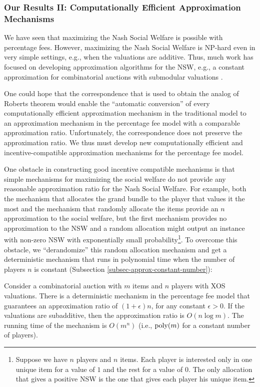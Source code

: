 \documentclass{theoretics}
\newcommand{\poly}{\hbox{poly}}
\begin{document}
\subsubsection*{Our Results II: Computationally Efficient Approximation Mechanisms}

We have seen that maximizing the Nash Social Welfare is possible with percentage fees. However, maximizing the Nash Social Welfare is NP-hard even in very simple settings, e.g., when the valuations are additive. Thus, much work has focused on developing approximation algorithms for the NSW, e.g., a constant approximation for combinatorial auctions with submodular valuations \cite{LV22,GHLVV22}. 



One could hope that the correspondence that is used to obtain the analog of Roberts theorem would enable the ``automatic conversion'' of every computationally efficient approximation mechanism in the traditional model to an approximation mechanism in the percentage fee model with a comparable approximation ratio. Unfortunately, the correspondence does not preserve the approximation ratio. We thus must develop new computationally efficient and incentive-compatible approximation mechanisms for the percentage fee model.





One obstacle in constructing good incentive compatible mechanisms is that simple mechanisms for maximizing the social welfare do not provide any reasonable approximation ratio for the Nash Social Welfare. For example, both the mechanism that allocates the grand bundle to the player that values it the most and the mechanism that randomly allocate the items provide an $n$ approximation to the social welfare, but the first mechanism provides no approximation to the NSW and a random allocation might output an instance with non-zero NSW with exponentially small probability\footnote{Suppose we have $n$ players and $n$ items. Each player is interested only in one unique item for a value of $1$ and the rest for a value of $0$. The only allocation that gives a positive NSW is the one that gives each player his unique item.}. To overcome this obstacle, we ``derandomize'' this random allocation mechanism and get a deterministic mechanism that runs in polynomial time when the number of players $n$ is constant (Subsection \ref{subsec-approx-constant-number}):

\begin{theorem*}
Consider a combinatorial auction with $m$ items and $n$ players with XOS valuations. There is a deterministic mechanism in the percentage fee model that guarantees an approximation ratio of $(1+\epsilon) n$, for any constant $\epsilon>0$. If the valuations are subadditive, then the approximation ratio is $O(n \log m)$. The running time of the mechanism is $O(m^n)$ (i.e., $\poly(m)$ for a constant number of players).
\end{theorem*}
\end{document}
